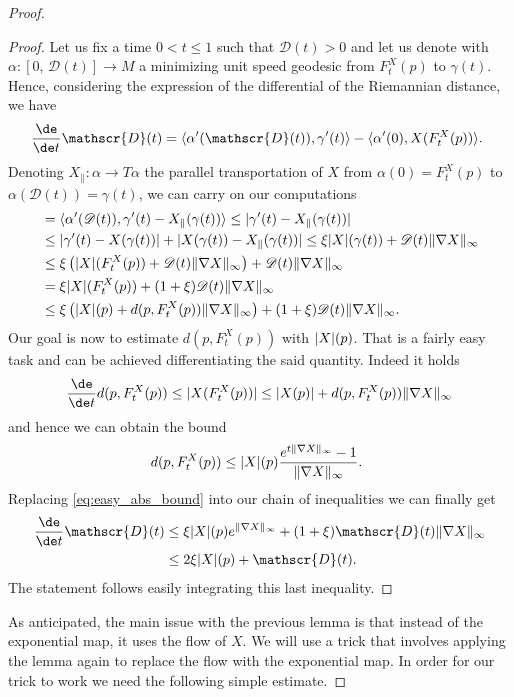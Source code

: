 \documentclass[JEP,XML,SOM,Unicode]{cedram}
\theoremstyle{plain}
\theoremstyle{definition}
\numberwithin{equation}{section}
\newcommand{\D}{\mathscr{D}}
\newcommand{\cc}[2]{\ensuremath{\left[#1,\,#2\right]}}
\newcommand{\fullstop}{\ensuremath{\text{. }}}
\newcommand{\scalprod}[2]{\ensuremath{\langle #1, #2\rangle}}
\newcommand{\Xpar}{X_{\parallel}}
\DeclarePairedDelimiter\abs{\lvert}{\rvert}
\DeclarePairedDelimiter\norm{\lVert}{\rVert}
\begin{document}
\begin{proof}
\begin{proof}
Let us fix a time $0<t\le 1$ such that $\D(t)>0$ and let us denote with \hbox{$\alpha:\cc{0}{\D(t)}\to M$}
a minimizing unit speed geodesic from $F_t^X(p)$ to $\gamma(t)$.
Hence, considering the expression of the differential of the Riemannian distance, we have
\begin{equation*}
\frac{\de}{\de t}\D(t)
= \scalprod{\alpha'(\D(t))}{\gamma'(t)}-\scalprod{\alpha'(0)}{X(F_t^X(p))}\fullstop
\end{equation*}
Denoting $\Xpar:\alpha\to T\alpha$ the parallel transportation of $X$ from $\alpha(0)=F_t^X(p)$ to
$\alpha(\D(t))=\gamma(t)$, we can carry on our computations
\begin{align*}
&=\scalprod{\alpha'(\D(t))}{\gamma'(t)-\Xpar(\gamma(t))}
\le \abs{\gamma'(t)-\Xpar(\gamma(t))} \\
&\le \abs{\gamma'(t)-X(\gamma(t))} + \abs{X(\gamma(t))-\Xpar(\gamma(t))}
\le \xi\abs{X}(\gamma(t))+\D(t)\norm{\nabla X}_{\infty} \\
&\le \xi\left(\abs{X}(F_t^X(p))+\D(t)\norm{\nabla X}_{\infty}\right)
+\D(t)\norm{\nabla X}_{\infty}\\
&= \xi\abs{X}(F_t^X(p))+(1+\xi)\D(t)\norm{\nabla X}_{\infty}\\
&\le \xi\left(\abs{X}(p) + d(p,F_t^X(p))\norm{\nabla X}_{\infty}\right)+
(1+\xi)\D(t)\norm{\nabla X}_{\infty}\fullstop
\end{align*}
Our goal is now to estimate $d(p,F_t^X(p))$ with $\abs{X}(p)$.
That is a fairly easy task and can be achieved differentiating the said quantity. Indeed it holds
\begin{equation*}
\frac{\de}{\de t} d(p, F_t^X(p)) \le \abs{X(F_t^X(p))}
\le \abs{X(p)}+d(p, F_t^X(p))\norm{\nabla X}_\infty
\end{equation*}
and hence we can obtain the bound
\begin{equation}\label{eq:easy_abs_bound}
d(p,F_t^X(p))
\le \abs{X}(p)\frac{e^{t\norm{\nabla X}_{\infty}}-1}{\norm{\nabla X}_{\infty}}\fullstop
\end{equation}
Replacing \cref{eq:easy_abs_bound} into our chain of inequalities we can finally get
\begin{align*}
\frac{\de}{\de t}\D(t)
&\le \xi\abs{X}(p)e^{\norm{\nabla X}_{\infty}}
+(1+\xi)\D(t)\norm{\nabla X}_{\infty} \\
&\le 2\xi\abs{X}(p)+\D(t) \fullstop
\end{align*}
The statement follows easily integrating this last inequality.
\end{proof}
As anticipated, the main issue with the previous lemma is that instead of the exponential map, it uses
the flow of $X$. We will use a trick that involves applying the lemma again to replace the
flow with the exponential map. In order for our trick to work we need the following simple estimate.


\end{proof}
\end{document}
